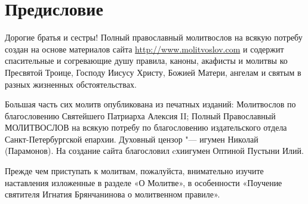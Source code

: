 \chapter*{Предисловие}

Дорогие братья и сестры! Полный православный молитвослов на всякую потребу создан на основе материалов сайта \url{http://www.molitvoslov.com} и содержит спасительные и согревающие душу правила, каноны, акафисты и молитвы ко Пресвятой Троице, Господу Иисусу Христу, Божией Матери, ангелам и святым в разных жизненных обстоятельствах.

Большая часть сих молитв опубликована из печатных изданий: Молитвослов по благословению Святейшего Патриарха Алексия II; Полный Православный МОЛИТВОСЛОВ на всякую потребу по благословению издательского отдела Санкт-Петербургской епархии. Духовный цензор "--- игумен Николай (Парамонов). На создание сайта благословил cхиигумен Оптиной Пустыни Илий.

Прежде чем приступать к молитвам, пожалуйста, внимательно изучите наставления изложенные в разделе «О Молитве», в особенности «Поучение святителя Игнатия Брянчанинова о молитвенном правиле».

